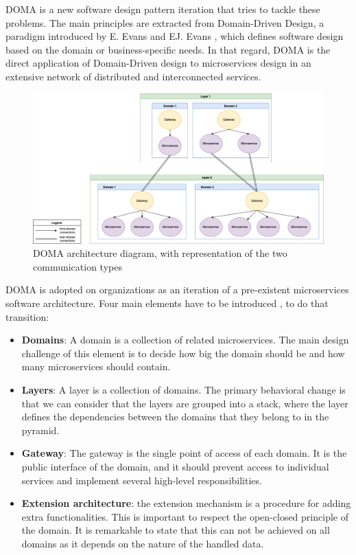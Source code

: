 \documentclass[english, 12pt, a4paper, sci, utf8, a-1b, online]{aaltothesis}
\begin{document}
DOMA is a new software design pattern iteration that tries to tackle these problems. The main principles are extracted from Domain-Driven Design, a paradigm introduced by E. Evans and EJ. Evans \cite{evans2004domain}, which defines software design based on the domain or business-specific needs. In that regard, DOMA is the direct application of Domain-Driven design to microservices design in an extensive network of distributed and interconnected services.\\

\begin{figure}[h!]
    \centering
    \includegraphics[scale=0.3]{src/thesis/img/literature-review/doma.png}
    \caption{DOMA architecture diagram, with representation of the two communication types}
    \label{fig:my_label}
\end{figure}

DOMA is adopted on organizations as an iteration of a pre-existent microservices software architecture. Four main elements have to be introduced \cite{DOMAUber}, to do that transition:

\begin{itemize}
    \item \textbf{Domains}: A domain is a collection of related microservices. The main design challenge of this element is to decide how big the domain should be and how many microservices should contain.
    \item \textbf{Layers}: A layer is a collection of domains. The primary behavioral change is that we can consider that the layers are grouped into a stack, where the layer defines the dependencies between the domains that they belong to in the pyramid.
    \item \textbf{Gateway}: The gateway is the single point of access of each domain. It is the public interface of the domain, and it should prevent access to individual services and implement several high-level responsibilities.
    \item \textbf{Extension architecture}: the extension mechanism is a procedure for adding extra functionalities. This is important to respect the open-closed principle of the domain. It is remarkable to state that this can not be achieved on all domains as it depends on the nature of the handled data.
\end{itemize}
\end{document}
